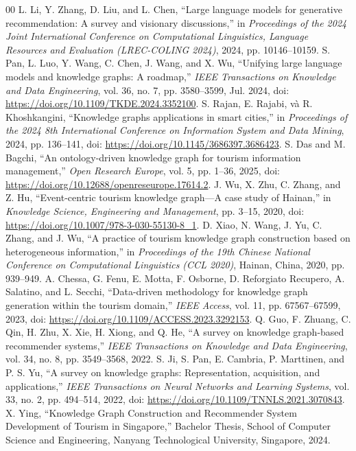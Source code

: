 \documentclass[journal,onecolumn,10pt]{IEEEtran}
\begin{document}
\begin{thebibliography}{00}
 L. Li, Y. Zhang, D. Liu, and L. Chen, ``Large language models for generative recommendation: A survey and visionary discussions,'' in \textit{Proceedings of the 2024 Joint International Conference on Computational Linguistics, Language Resources and Evaluation (LREC-COLING 2024)}, 2024, pp. 10146--10159.
 S. Pan, L. Luo, Y. Wang, C. Chen, J. Wang, and X. Wu, ``Unifying large language models and knowledge graphs: A roadmap,'' \textit{IEEE Transactions on Knowledge and Data Engineering}, vol. 36, no. 7, pp. 3580--3599, Jul. 2024, doi: \url{https://doi.org/10.1109/TKDE.2024.3352100}.
 S. Rajan, E. Rajabi, và R. Khoshkangini, ``Knowledge graphs applications in smart cities,'' in \textit{Proceedings of the 2024 8th International Conference on Information System and Data Mining}, 2024, pp. 136--141, doi: \url{https://doi.org/10.1145/3686397.3686423}.
 S. Das and M. Bagchi, ``An ontology-driven knowledge graph for tourism information management,'' \textit{Open Research Europe}, vol. 5, pp. 1--36, 2025, doi: \url{https://doi.org/10.12688/openreseurope.17614.2}.
 J. Wu, X. Zhu, C. Zhang, and Z. Hu, ``Event-centric tourism knowledge graph---A case study of Hainan,'' in \textit{Knowledge Science, Engineering and Management}, pp. 3--15, 2020, doi: \url{https://doi.org/10.1007/978-3-030-55130-8_1}.
 D. Xiao, N. Wang, J. Yu, C. Zhang, and J. Wu, ``A practice of tourism knowledge graph construction based on heterogeneous information,'' in \textit{Proceedings of the 19th Chinese National Conference on Computational Linguistics (CCL 2020)}, Hainan, China, 2020, pp. 939--949.
 A. Chessa, G. Fenu, E. Motta, F. Osborne, D. Reforgiato Recupero, A. Salatino, and L. Secchi, ``Data-driven methodology for knowledge graph generation within the tourism domain,'' \textit{IEEE Access}, vol. 11, pp. 67567--67599, 2023, doi: \url{https://doi.org/10.1109/ACCESS.2023.3292153}.
 Q. Guo, F. Zhuang, C. Qin, H. Zhu, X. Xie, H. Xiong, and Q. He, ``A survey on knowledge graph-based recommender systems,'' \textit{IEEE Transactions on Knowledge and Data Engineering}, vol. 34, no. 8, pp. 3549--3568, 2022.
 S. Ji, S. Pan, E. Cambria, P. Marttinen, and P. S. Yu, ``A survey on knowledge graphs: Representation, acquisition, and applications,'' \textit{IEEE Transactions on Neural Networks and Learning Systems}, vol. 33, no. 2, pp. 494--514, 2022, doi: \url{https://doi.org/10.1109/TNNLS.2021.3070843}.
 X. Ying, ``Knowledge Graph Construction and Recommender System Development of Tourism in Singapore,'' Bachelor Thesis, School of Computer Science and Engineering, Nanyang Technological University, Singapore, 2024.

\end{thebibliography}
\end{document}
